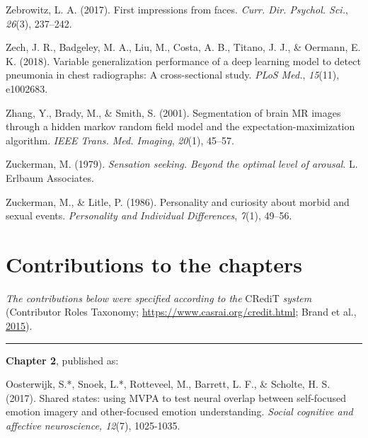 \documentclass[12pt,american,a4paper,oneside,]{memoir} %
\begin{document}
\leavevmode\hypertarget{ref-Zebrowitz2017-qe}{}%
Zebrowitz, L. A. (2017). First impressions from faces. \emph{Curr. Dir. Psychol. Sci.}, \emph{26}(3), 237--242.

\leavevmode\hypertarget{ref-Zech2018-bq}{}%
Zech, J. R., Badgeley, M. A., Liu, M., Costa, A. B., Titano, J. J., \& Oermann, E. K. (2018). Variable generalization performance of a deep learning model to detect pneumonia in chest radiographs: A cross-sectional study. \emph{PLoS Med.}, \emph{15}(11), e1002683.

\leavevmode\hypertarget{ref-Zhang2001-wa}{}%
Zhang, Y., Brady, M., \& Smith, S. (2001). Segmentation of brain MR images through a hidden markov random field model and the expectation-maximization algorithm. \emph{IEEE Trans. Med. Imaging}, \emph{20}(1), 45--57.

\leavevmode\hypertarget{ref-zuckerman1979}{}%
Zuckerman, M. (1979). \emph{Sensation seeking. Beyond the optimal level of arousal}. L. Erlbaum Associates.

\leavevmode\hypertarget{ref-zuckerman1986personality}{}%
Zuckerman, M., \& Litle, P. (1986). Personality and curiosity about morbid and sexual events. \emph{Personality and Individual Differences}, \emph{7}(1), 49--56.

\endgroup

\hypertarget{contributions-to-the-chapters}{%
\chapter*{Contributions to the chapters}\label{contributions-to-the-chapters}}

\setlength{\parindent}{0pt}
\small

\emph{The contributions below were specified according to the} CRediT \emph{system} (Contributor Roles Taxonomy; \url{https://www.casrai.org/credit.html}; Brand et al., \protect\hyperlink{ref-brand2015beyond}{2015}).

\begin{center}\rule{0.5\linewidth}{0.5pt}\end{center}

\textbf{Chapter 2}, published as:
\vspace{2mm}

Oosterwijk, S.*, Snoek, L.*, Rotteveel, M., Barrett, L. F., \& Scholte, H. S. (2017). Shared states: using MVPA to test neural overlap between self-focused emotion imagery and other-focused emotion understanding. \emph{Social cognitive and affective neuroscience, 12}(7), 1025-1035.
\end{document}
